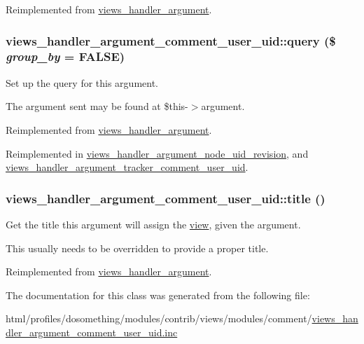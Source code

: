 Reimplemented from \hyperlink{classviews__handler__argument_a9fad9ab1a7aaa5915baf13a2872faa70}{views\_\-handler\_\-argument}.\hypertarget{classviews__handler__argument__comment__user__uid_a6c3118256c6d2c60167d289c947d31c6}{
\subsubsection[{query}]{\setlength{\rightskip}{0pt plus 5cm}views\_\-handler\_\-argument\_\-comment\_\-user\_\-uid::query (\$ {\em group\_\-by} = {\ttfamily FALSE})}}
\label{classviews__handler__argument__comment__user__uid_a6c3118256c6d2c60167d289c947d31c6}
Set up the query for this argument.

The argument sent may be found at \$this-\/$>$argument. 

Reimplemented from \hyperlink{classviews__handler__argument_af9ddabf5d386782c8ffc5785b7ae4263}{views\_\-handler\_\-argument}.

Reimplemented in \hyperlink{classviews__handler__argument__node__uid__revision_a25585cd59a236e99a364fe0a1d6f9b90}{views\_\-handler\_\-argument\_\-node\_\-uid\_\-revision}, and \hyperlink{classviews__handler__argument__tracker__comment__user__uid_aa47cdf41b905e786067d25527bca1f1f}{views\_\-handler\_\-argument\_\-tracker\_\-comment\_\-user\_\-uid}.\hypertarget{classviews__handler__argument__comment__user__uid_a4e106a92bbbdb88e1207fe525480c18b}{
\subsubsection[{title}]{\setlength{\rightskip}{0pt plus 5cm}views\_\-handler\_\-argument\_\-comment\_\-user\_\-uid::title ()}}
\label{classviews__handler__argument__comment__user__uid_a4e106a92bbbdb88e1207fe525480c18b}
Get the title this argument will assign the \hyperlink{classview}{view}, given the argument.

This usually needs to be overridden to provide a proper title. 

Reimplemented from \hyperlink{classviews__handler__argument_a76181ac24e7be4a09aaafc1fa5f15ea1}{views\_\-handler\_\-argument}.

The documentation for this class was generated from the following file:\begin{DoxyCompactItemize}
\item 
html/profiles/dosomething/modules/contrib/views/modules/comment/\hyperlink{views__handler__argument__comment__user__uid_8inc}{views\_\-handler\_\-argument\_\-comment\_\-user\_\-uid.inc}\end{DoxyCompactItemize}
